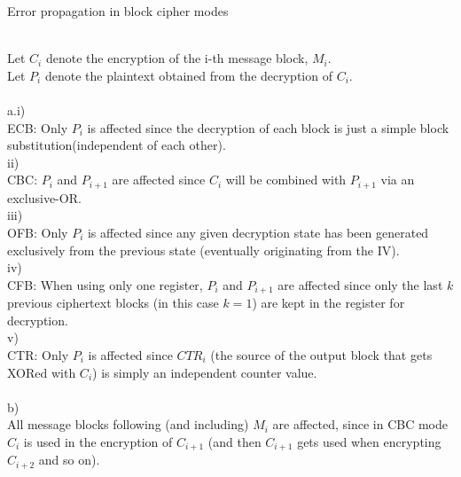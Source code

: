 \documentclass{assignment}
\begin{document}
\begin{problemlist}
\pbitem Error propagation in block cipher modes
\begin{problem}
\begin{answer}
\\
Let $C_i$ denote the encryption of the i-th message block, $M_i$.\\
Let $P_i$ denote the plaintext obtained from the decryption of $C_i$.\\
\\
a.i)\\
ECB: Only $P_i$ is affected since the decryption of each block is just a simple block substitution(independent of each other).\\
ii)\\
CBC: $P_i$ and $P_{i+1}$ are affected since $C_i$ will be combined with $P_{i+1}$ via an exclusive-OR.\\
iii)\\
OFB: Only $P_i$ is affected since any given decryption state has been generated exclusively from the previous state (eventually originating from the IV).\\
iv)\\
CFB: When using only one register, $P_i$ and $P_{i+1}$ are affected since only the last $k$ previous ciphertext blocks (in this case $k=1$) are kept in the register for decryption. \\
v)\\
CTR: Only $P_i$ is affected since $CTR_i$ (the source of the output block that gets XORed with $C_i$) is simply an independent counter value.\\
\\
b)\\
All message blocks following (and including) $M_i$ are affected, since in CBC mode $C_i$ is used in the encryption of $C_{i+1}$ (and then $C_{i+1}$ gets used when encrypting $C_{i+2}$ and so on).\\
\\
\end{answer}
\end{problem}

\end{problemlist}
\end{document}
